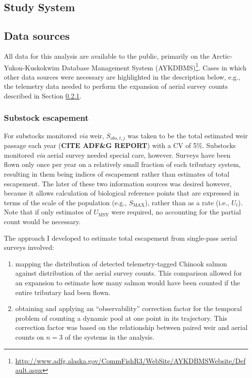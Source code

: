 \documentclass[12pt,]{book}
\let\rmarkdownfootnote\footnote%
\def\footnote{\protect\rmarkdownfootnote}
\theoremstyle{definition}
\theoremstyle{definition}
\theoremstyle{definition}
\theoremstyle{remark}
\begin{document}
\subsection{Study System}\label{study-system}

\subsection{Data sources}\label{data-sources}

All data for this analysis are available to the public, primarily on the
Arctic-Yukon-Kuskokwim Database Management System (AYKDBMS)\footnote{\url{http://www.adfg.alaska.gov/CommFishR3/WebSite/AYKDBMSWebsite/Default.aspx}}.
Cases in which other data sources were necessary are highlighted in the
description below, e.g., the telemetry data needed to perform the
expansion of aerial survey counts described in Section
\ref{air-expansion}.

\subsubsection{Substock escapement}\label{air-expansion}

\noindent
For substocks monitored \emph{via} weir, \(S_{obs,t,j}\) was taken to be
the total estimated weir passage each year (\textbf{CITE ADF\&G REPORT})
with a CV of 5\%. Substocks monitored \emph{via} aerial survey needed
special care, however. Surveys have been flown only once per year on a
relatively small fraction of each tributary system, resulting in them
being indices of escapement rather than estimates of total escapement.
The later of these two information sources was desired however, because
it allows calculation of biological reference points that are expressed
in terms of the scale of the population (e.g., \(S_{\text{MAX}}\)),
rather than as a rate (i.e., \(U_t\)). Note that if only estimates of
\(U_{\text{MSY}}\) were required, no accounting for the partial count
would be necessary.

The approach I developed to estimate total escapement from single-pass
aerial surveys involved:

\begin{enumerate}
\def\labelenumi{(\alph{enumi})}
\item
  mapping the distribution of detected telemetry-tagged Chinook salmon
  against distribution of the aerial survey counts. This comparison
  allowed for an expansion to estimate how many salmon would have been
  counted if the entire tributary had been flown.
\item
  obtaining and applying an ``observability'' correction factor for the
  temporal problem of counting a dynamic pool at one point in its
  trajectory. This correction factor was based on the relationship
  between paired weir and aerial counts on \(n=3\) of the systems in the
  analysis.
\end{enumerate}
\end{document}
